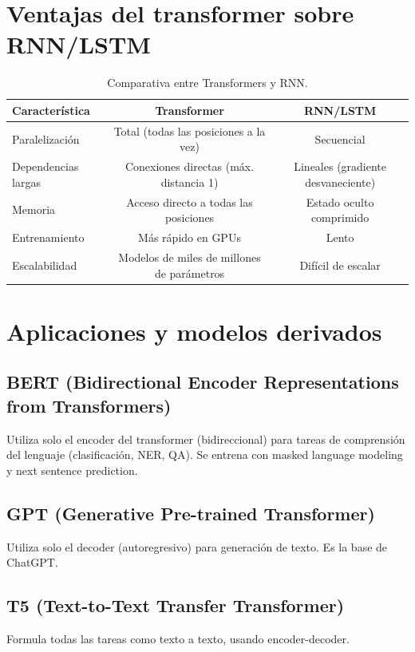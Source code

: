 \documentclass[12pt,a4paper,openany,oneside]{book}
\begin{document}
\section{Ventajas del transformer sobre RNN/LSTM}

\begin{table}[h]
\centering
\begin{tabular}{|l|c|c|}
\hline
\textbf{Característica} & \textbf{Transformer} & \textbf{RNN/LSTM} \\
\hline
Paralelización & Total (todas las posiciones a la vez) & Secuencial \\
Dependencias largas & Conexiones directas (máx. distancia 1) & Lineales (gradiente desvaneciente) \\
Memoria & Acceso directo a todas las posiciones & Estado oculto comprimido \\
Entrenamiento & Más rápido en GPUs & Lento \\
Escalabilidad & Modelos de miles de millones de parámetros & Difícil de escalar \\
\hline
\end{tabular}
\caption{Comparativa entre Transformers y RNN.}
\end{table}

\section{Aplicaciones y modelos derivados}

\subsection{BERT (Bidirectional Encoder Representations from Transformers)}
Utiliza solo el encoder del transformer (bidireccional) para tareas de comprensión del lenguaje (clasificación, NER, QA). Se entrena con masked language modeling y next sentence prediction.

\subsection{GPT (Generative Pre-trained Transformer)}
Utiliza solo el decoder (autoregresivo) para generación de texto. Es la base de ChatGPT.

\subsection{T5 (Text-to-Text Transfer Transformer)}
Formula todas las tareas como texto a texto, usando encoder-decoder.
\end{document}
